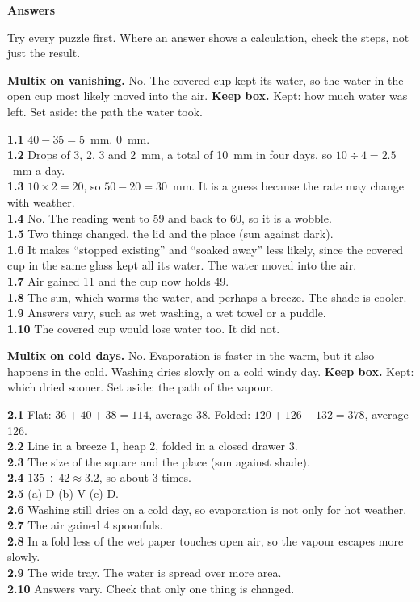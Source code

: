 \clearpage\label{answers}
{\sans\bfseries\LARGE\color{ink} Answers}\par
\footnotesize\linespread{0.94}\selectfont
Try every puzzle first. Where an answer shows a calculation, check the steps, not just the result.

\textbf{Multix on vanishing.} No. The covered cup kept its water, so the water in the open cup most likely moved into the air. \textbf{Keep box.} Kept: how much water was left. Set aside: the path the water took.

\textbf{1.1} $40-35=5$~mm. 0~mm.\\
\textbf{1.2} Drops of 3, 2, 3 and 2~mm, a total of 10~mm in four days, so $10\div4=2.5$~mm a day.\\
\textbf{1.3} $10\times2=20$, so $50-20=30$~mm. It is a guess because the rate may change with weather.\\
\textbf{1.4} No. The reading went to 59 and back to 60, so it is a wobble.\\
\textbf{1.5} Two things changed, the lid and the place (sun against dark).\\
\textbf{1.6} It makes ``stopped existing'' and ``soaked away'' less likely, since the covered cup in the same glass kept all its water. The water moved into the air.\\
\textbf{1.7} Air gained 11 and the cup now holds 49.\\
\textbf{1.8} The sun, which warms the water, and perhaps a breeze. The shade is cooler.\\
\textbf{1.9} Answers vary, such as wet washing, a wet towel or a puddle.\\
\textbf{1.10} The covered cup would lose water too. It did not.

\textbf{Multix on cold days.} No. Evaporation is faster in the warm, but it also happens in the cold. Washing dries slowly on a cold windy day. \textbf{Keep box.} Kept: which dried sooner. Set aside: the path of the vapour.

\textbf{2.1} Flat: $36+40+38=114$, average 38. Folded: $120+126+132=378$, average 126.\\
\textbf{2.2} Line in a breeze 1, heap 2, folded in a closed drawer 3.\\
\textbf{2.3} The size of the square and the place (sun against shade).\\
\textbf{2.4} $135\div42\approx3.2$, so about 3 times.\\
\textbf{2.5} (a) D (b) V (c) D.\\
\textbf{2.6} Washing still dries on a cold day, so evaporation is not only for hot weather.\\
\textbf{2.7} The air gained 4 spoonfuls.\\
\textbf{2.8} In a fold less of the wet paper touches open air, so the vapour escapes more slowly.\\
\textbf{2.9} The wide tray. The water is spread over more area.\\
\textbf{2.10} Answers vary. Check that only one thing is changed.

